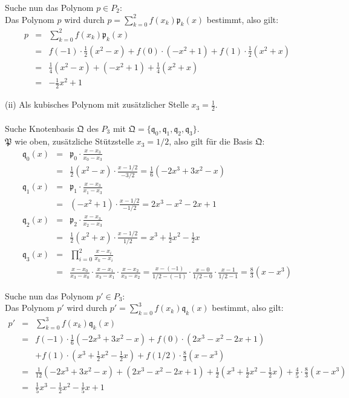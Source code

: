 \documentclass[11pt,a4paper,ngerman]{article}
\begin{document}
Suche nun das Polynom $p \in P_2$:\\
Das Polynom $p$ wird durch $p = \sum_{k=0}^{2}{f(x_k) \mathfrak{p}_k(x)}$ bestimmt, also gilt:
\begin{eqnarray*}
p & = &\sum_{k=0}^{2}{f(x_k) \mathfrak{p}_k(x)} \\
  & = & f(-1) \cdot \frac{1}{2}(x^2 - x)
  + f(0) \cdot (-x^2 + 1)
  + f(1) \cdot \frac{1}{2}(x^2 + x) \\
  & = & \frac{1}{4}(x^2 - x) + (-x^2 + 1) + \frac{1}{4}(x^2 + x) \\
  & = & -\frac{1}{2}x^2 + 1
\end{eqnarray*}

(ii) Als kubisches Polynom mit zusätzlicher Stelle $x_3 = \frac{1}{2}$. \\ \\
Suche Knotenbasis $\mathfrak{Q}$ des $P_3$ mit $\mathfrak{Q} = \{\mathfrak{q}_0, \mathfrak{q}_1,\mathfrak{q}_2, \mathfrak{q}_3 \}$.\\

$\mathfrak{P}$ wie oben, zusätzliche Stützstelle $x_3 = 1/2$, also gilt für die Basis $\mathfrak{Q}$:
\begin{eqnarray*}
\mathfrak{q}_0(x) & = & \mathfrak{p}_0 \cdot \frac{x-x_3}{x_0-x_3} \\
 & = & \frac{1}{2}(x^2 - x) \cdot \frac{x-1/2}{-3/2}
   = \frac{1}{6}(-2x^3 + 3x^2 - x) \\
\mathfrak{q}_1(x) & = & \mathfrak{p}_1 \cdot \frac{x-x_3}{x_1-x_3} \\
 & = & (-x^2 + 1) \cdot \frac{x-1/2}{-1/2}
   = 2x^3 - x^2 - 2x + 1 \\
\mathfrak{q}_2(x) & = & \mathfrak{p}_2 \cdot \frac{x-x_3}{x_2-x_3} \\
 & = & \frac{1}{2}(x^2 + x) \cdot \frac{x-1/2}{1/2}
   = x^3 + \frac{1}{2}x^2 - \frac{1}{2}x\\
\mathfrak{q}_3(x) & = & \prod_{i = 0}^{2}{\frac{x-x_i}{x_k-x_i}} \\
 & = & \frac{x-x_0}{x_3-x_0} \cdot \frac{x-x_1}{x_3-x_1} \cdot \frac{x-x_2}{x_3-x_2}
   = \frac{x-(-1)}{1/2 - (-1)} \cdot \frac{x - 0}{1/2 - 0} \cdot \frac{x-1}{1/2 - 1}
   = \frac{8}{3} (x - x^3)
\end{eqnarray*}

Suche nun das Polynom $p' \in P_3$:\\
Das Polynom $p'$ wird durch $p' = \sum_{k=0}^{3}{f(x_k) \mathfrak{q}_k(x)}$ bestimmt, also gilt:
\begin{eqnarray*}
p' & = & \sum_{k=0}^{3}{f(x_k) \mathfrak{q}_k(x)} \\
   & = & f(-1) \cdot \frac{1}{6}(-2x^3 + 3x^2 - x)
  + f(0) \cdot (2x^3 - x^2 - 2x + 1) \\
   & & + f(1) \cdot (x^3 + \frac{1}{2}x^2 - \frac{1}{2}x)
  + f(1/2) \cdot \frac{8}{3} (x - x^3) \\
   & = & \frac{1}{12}(-2x^3 + 3x^2 - x) + (2x^3 - x^2 - 2x + 1) + \frac{1}{2}(x^3 + \frac{1}{2}x^2 - \frac{1}{2}x) + \frac{4}{5} \cdot \frac{8}{3} (x - x^3) \\
   & = & \frac{1}{5}x^3 - \frac{1}{2}x^2 - \frac{1}{5}x + 1
\end{eqnarray*}
\end{document}
